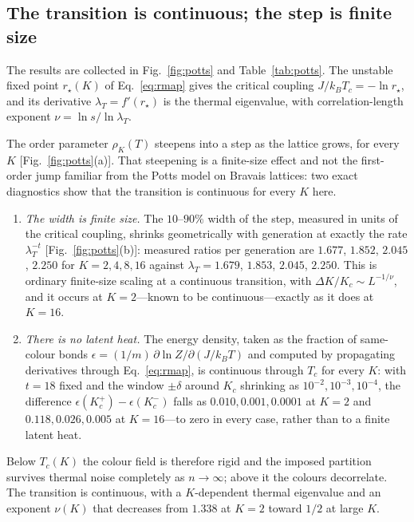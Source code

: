 \documentclass[preprint,12pt]{elsarticle}
\begin{document}
\subsection{The transition is continuous; the step is finite size}

The results are collected in Fig.~\ref{fig:potts} and Table~\ref{tab:potts}.
The unstable fixed point $r_\star(K)$ of Eq.~\eqref{eq:rmap} gives the critical
coupling $J/k_BT_c=-\ln r_\star$, and its derivative
$\lambda_T=f'(r_\star)$ is the thermal eigenvalue, with correlation-length
exponent $\nu=\ln s/\ln\lambda_T$.

The order parameter $\rho_K(T)$ steepens into a step as the lattice grows, for
every $K$ [Fig.~\ref{fig:potts}(a)]. That steepening is a finite-size effect
and not the first-order jump familiar from the Potts model on Bravais lattices:
two exact diagnostics show that the transition is continuous for every $K$
here.
\begin{enumerate}
\item \emph{The width is finite size.} The $10$--$90\%$ width of the step,
      measured in units of the critical coupling, shrinks geometrically with
      generation at exactly the rate $\lambda_T^{-t}$
      [Fig.~\ref{fig:potts}(b)]: measured ratios per generation are $1.677$,
      $1.852$, $2.045$, $2.250$ for $K=2,4,8,16$ against
      $\lambda_T=1.679$, $1.853$, $2.045$, $2.250$. This is ordinary
      finite-size scaling at a continuous transition, with $\Delta K/K_c\sim
      L^{-1/\nu}$, and it occurs at $K=2$---known to be continuous---exactly as
      it does at $K=16$.
\item \emph{There is no latent heat.} The energy density, taken as the fraction
      of same-colour bonds $\epsilon=(1/m)\,\partial\ln Z/\partial(J/k_BT)$ and
      computed by propagating derivatives through Eq.~\eqref{eq:rmap}, is
      continuous through $T_c$ for every $K$: with $t=18$ fixed and the window
      $\pm\delta$ around $K_c$ shrinking as $10^{-2},10^{-3},10^{-4}$, the
      difference $\epsilon(K_c^+)-\epsilon(K_c^-)$ falls as
      $0.010,0.001,0.0001$ at $K=2$ and $0.118,0.026,0.005$ at $K=16$---to zero
      in every case, rather than to a finite latent heat.
\end{enumerate}
Below $T_c(K)$ the colour field is therefore rigid and the imposed partition
survives thermal noise completely as $n\to\infty$; above it the colours
decorrelate. The transition is continuous, with a $K$-dependent thermal
eigenvalue and an exponent $\nu(K)$ that decreases from $1.338$ at $K=2$ toward
$1/2$ at large $K$.
\end{document}
